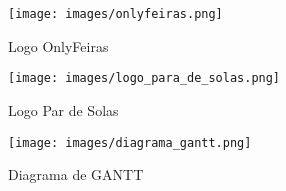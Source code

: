 \documentclass[a4paper,12pt]{scrreprt}
\begin{document}
        \begin{figure}[!ht]
            \centering
            \texttt{[image: images/onlyfeiras.png]}
            \caption{Logo OnlyFeiras}
            \label{fig:my_label}
        \end{figure}
    
        \begin{figure}[!ht]
            \centering
            \texttt{[image: images/logo\_para\_de\_solas.png]}
            \caption{Logo Par de Solas}
            \label{fig:my_label}
        \end{figure}
    \pagebreak
        \begin{figure}[!ht]
            \centering
            \texttt{[image: images/diagrama\_gantt.png]}
            \caption{Diagrama de GANTT}
            \label{fig:my_label}
        \end{figure}

\end{document}
